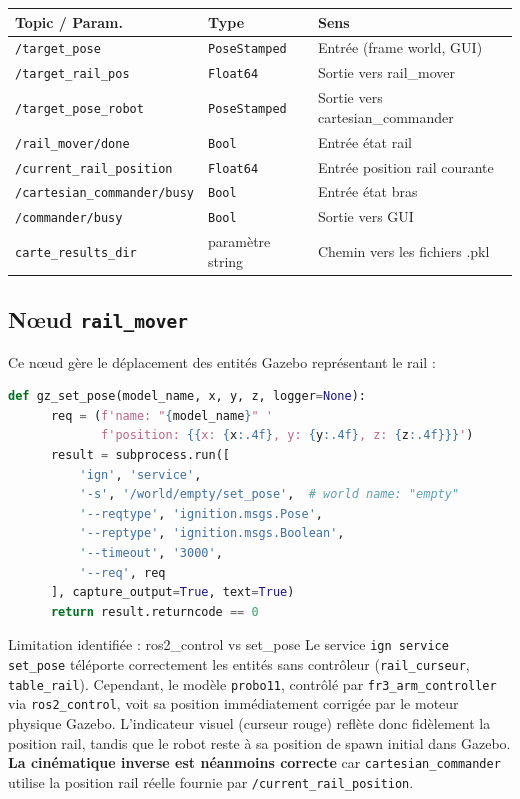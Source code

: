 \documentclass[11pt, a4paper]{article}
\newcommand{\topic}[1]{\texttt{\color{AccentOrange}#1}}
\begin{document}
\begin{center}
\begin{tabular}{lll}
  \toprule
  \rowcolor{LightPurple}
  \textbf{Topic / Param.} & \textbf{Type} & \textbf{Sens} \\
  \midrule
  \topic{/target\_pose}           & \texttt{PoseStamped} & Entrée (frame world, GUI) \\
  \topic{/target\_rail\_pos}      & \texttt{Float64}     & Sortie vers rail\_mover \\
  \topic{/target\_pose\_robot}    & \texttt{PoseStamped} & Sortie vers cartesian\_commander \\
  \topic{/rail\_mover/done}       & \texttt{Bool}        & Entrée état rail \\
  \topic{/current\_rail\_position}& \texttt{Float64}     & Entrée position rail courante \\
  \topic{/cartesian\_commander/busy} & \texttt{Bool}     & Entrée état bras \\
  \topic{/commander/busy}         & \texttt{Bool}        & Sortie vers GUI \\
  \texttt{carte\_results\_dir}    & paramètre string     & Chemin vers les fichiers .pkl \\
  \bottomrule
\end{tabular}
\end{center}

\subsection{Nœud \texttt{rail\_mover}}

Ce nœud gère le déplacement des entités Gazebo représentant le rail :

\begin{lstlisting}[language=python, caption={Appel service Gazebo dans rail\_mover.py}]
  def gz_set_pose(model_name, x, y, z, logger=None):
      req = (f'name: "{model_name}" '
             f'position: {{x: {x:.4f}, y: {y:.4f}, z: {z:.4f}}}')
      result = subprocess.run([
          'ign', 'service',
          '-s', '/world/empty/set_pose',  # world name: "empty"
          '--reqtype', 'ignition.msgs.Pose',
          '--reptype', 'ignition.msgs.Boolean',
          '--timeout', '3000',
          '--req', req
      ], capture_output=True, text=True)
      return result.returncode == 0
\end{lstlisting}

\begin{warnbox}{Limitation identifiée : ros2\_control vs set\_pose}
Le service \texttt{ign service set\_pose} téléporte correctement les entités sans contrôleur (\texttt{rail\_curseur}, \texttt{table\_rail}). Cependant, le modèle \texttt{probo11}, contrôlé par \texttt{fr3\_arm\_controller} via \texttt{ros2\_control}, voit sa position immédiatement corrigée par le moteur physique Gazebo. L'indicateur visuel (curseur rouge) reflète donc fidèlement la position rail, tandis que le robot reste à sa position de spawn initial dans Gazebo. \textbf{La cinématique inverse est néanmoins correcte} car \texttt{cartesian\_commander} utilise la position rail réelle fournie par \topic{/current\_rail\_position}.
\end{warnbox}
\end{document}
